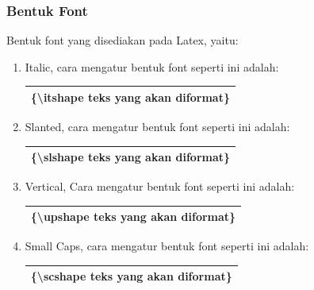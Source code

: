 \subsubsection{Bentuk Font}
Bentuk font yang disediakan pada Latex, yaitu:
\begin{enumerate}
\item Italic, cara mengatur bentuk font seperti ini adalah:\\
\begin{tabular}{|p{12 cm }|}
\hline
\{\textbackslash itshape teks yang akan diformat\}\\
\hline
\end{tabular}

\item Slanted,  cara mengatur bentuk font seperti ini adalah:\\
\begin{tabular}{|p{12 cm }|}
\hline
\{\textbackslash slshape teks yang akan diformat\}\\
\hline
\end{tabular}
\item 	Vertical, Cara mengatur bentuk font seperti ini adalah:\\
\begin{tabular}{|p{12 cm }|}
\hline
\{\textbackslash upshape teks yang akan diformat\}\\
\hline
\end{tabular}
\item   Small Caps, cara mengatur bentuk font seperti ini adalah:\\
\begin{tabular}{|p{12 cm }|}
\hline
\{\textbackslash scshape teks yang akan diformat\}\\
\hline
\end{tabular}
\end{enumerate}
